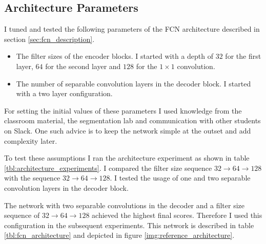 \documentclass[11pt, onecolumn, oneside, reqno]{article}
\begin{document}
\subsection{Architecture Parameters}
\label{sec:reference_architecture}
I tuned and tested the following parameters of the FCN architecture described in section \ref{sec:fcn_description}.
\begin{itemize}
\item The filter sizes of the encoder blocks. I started with a depth of $32$ for the first layer, $64$ for the second layer and $128$ for the $1 \times 1$ convolution. 
\item The number of separable convolution layers in the decoder block. I started with a two layer configuration.
\end{itemize}

For setting the initial values of these parameters I used knowledge from the classroom material, the segmentation lab and communication with other students on Slack. One such advice is to keep the network simple at the outset and add complexity later. 

To test these assumptions I ran the architecture experiment as shown in table \ref{tbl:architecture_experiments}. I compared the filter size sequence $32 \rightarrow 64 \rightarrow 128$ with the sequence $32 \rightarrow 64 \rightarrow 128$. I tested the usage of one and two separable convolution layers in the decoder block.

The network with two separable convolutions in the decoder and a filter size sequence of $32 \rightarrow 64 \rightarrow 128$ achieved the highest final scores.  Therefore I used this configuration in the subsequent experiments. This network is described in table \ref{tbl:fcn_architecture} and depicted in figure \ref{img:reference_architecture}.
\end{document}
